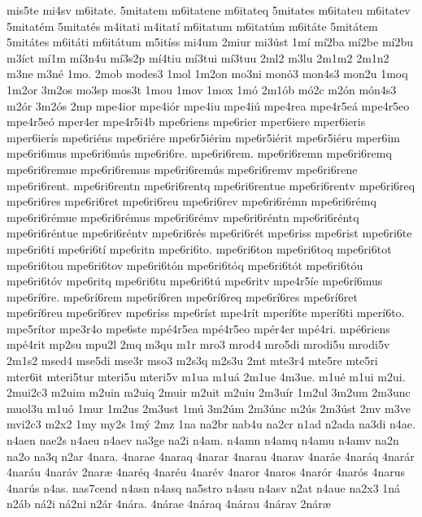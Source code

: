 {mis5te
mi4sv
m6itate.
5mitatem
m6itatene
m6itateq
5mitates
m6itateu
m6itatev
5mitat^^e9m
5mitat^^e9s
m4itati
m4itat^^ed
m6itatum
m6itat^^fam
m6it^^e1te
5mit^^e1tem
5mit^^e1tes
m6it^^e1ti
m6it^^e1tum
m5it^^edss
mi4um
2miur
mi3^^fast
1m^^ed
m^^ed2ba
m^^ed2be
m^^ed2bu
m3^^edct
m^^ed1m
m^^ed3n4u
m^^ed3s2p
m^^ed4tiu
m^^ed3tui
m^^ed3tuu
2ml2
m3lu
2m1m2
2m1n2
m3ne
m3n^^e9
1mo.
2mob
modes3
1mol
1m2on
mo3ni
mon^^f33
mon4s3
mon2u
1moq
1m2or
3m2os
mo3sp
mos3t
1mou
1mov
1mox
1m^^f3
2m1^^f3b
m^^f32c
m2^^f3n
m^^f3n4s3
m2^^f3r
3m2^^f3s
2mp
mpe4ior
mpe4i^^f3r
mpe4iu
mpe4i^^fa
mpe4rea
mpe4r5e^^e1
mpe4r5eo
mpe4r5e^^f3
mper4er
mpe4r5i4b
mpe6riens
mpe6rier
mper6iere
mper6ieris
mper6ier^^eds
mpe6ri^^e9ns
mpe6ri^^e9re
mpe6r5i^^e9rim
mpe6r5i^^e9rit
mpe6r5i^^e9ru
mper6im
mpe6ri6mus
mpe6ri6m^^fas
mpe6ri6re.
mpe6ri6rem.
mpe6ri6remn
mpe6ri6remq
mpe6ri6remue
mpe6ri6remus
mpe6ri6rem^^fas
mpe6ri6remv
mpe6ri6rene
mpe6ri6rent.
mpe6ri6rentn
mpe6ri6rentq
mpe6ri6rentue
mpe6ri6rentv
mpe6ri6req
mpe6ri6res
mpe6ri6ret
mpe6ri6reu
mpe6ri6rev
mpe6ri6r^^e9mn
mpe6ri6r^^e9mq
mpe6ri6r^^e9mue
mpe6ri6r^^e9mus
mpe6ri6r^^e9mv
mpe6ri6r^^e9ntn
mpe6ri6r^^e9ntq
mpe6ri6r^^e9ntue
mpe6ri6r^^e9ntv
mpe6ri6r^^e9s
mpe6ri6r^^e9t
mpe6riss
mpe6rist
mpe6ri6te
mpe6ri6ti
mpe6ri6t^^ed
mpe6ritn
mpe6ri6to.
mpe6ri6ton
mpe6ri6toq
mpe6ri6tot
mpe6ri6tou
mpe6ri6tov
mpe6ri6t^^f3n
mpe6ri6t^^f3q
mpe6ri6t^^f3t
mpe6ri6t^^f3u
mpe6ri6t^^f3v
mpe6ritq
mpe6ri6tu
mpe6ri6t^^fa
mpe6ritv
mpe4r5^^ede
mpe6r^^ed6mus
mpe6r^^ed6re.
mpe6r^^ed6rem
mpe6r^^ed6ren
mpe6r^^ed6req
mpe6r^^ed6res
mpe6r^^ed6ret
mpe6r^^ed6reu
mpe6r^^ed6rev
mpe6r^^edss
mpe6r^^edst
mpe4r^^edt
mper^^ed6te
mper^^ed6ti
mper^^ed6to.
mpe5r^^edtor
mpe3r4o
mpe6ste
mp^^e94r5ea
mp^^e94r5eo
mp^^e9r4er
mp^^e94ri.
mp^^e96riens
mp^^e94rit
mp2su
mpu2l
2mq
m3qu
m1r
mro3
mrod4
mro5di
mrodi5u
mrodi5v
2m1s2
msed4
mse5di
mse3r
mso3
m2s3q
m2s3u
2mt
mte3r4
mte5re
mte5ri
mter6it
mteri5tur
mteri5u
mteri5v
m1ua
m1u^^e1
2m1ue
4m3ue.
m1u^^e9
m1ui
m2ui.
2mui2c3
m2uim
m2uin
m2uiq
2muir
m2uit
m2uiu
2m3u^^edr
1m2ul
3m2um
2m3unc
muol3u
m1u^^f3
1mur
1m2us
2m3ust
1m^^fa
3m2^^fam
2m3^^fanc
m2^^fas
2m3^^fast
2mv
m3ve
mvi2c3
m2x2
1my
my2s
1m^^fd
2mz
1na
na2br
nab4u
na2cr
n1ad
n2ada
na3di
n4ae.
n4aen
nae2s
n4aeu
n4aev
na3ge
na2i
n4am.
n4amn
n4amq
n4amu
n4amv
na2n
na2o
na3q
n2ar
4nara.
4narae
4naraq
4narar
4narau
4narav
4nar^^e1e
4nar^^e1q
4nar^^e1r
4nar^^e1u
4nar^^e1v
2nar^^e6
4nar^^e9q
4nar^^e9u
4nar^^e9v
4naror
4naros
4nar^^f3r
4nar^^f3s
4narus
4nar^^fas
n4as.
nas7cend
n4asn
n4asq
na5stro
n4asu
n4asv
n2at
n4aue
na2x3
1n^^e1
n2^^e1b
n^^e12i
n^^e12ni
n2^^e1r
4n^^e1ra.
4n^^e1rae
4n^^e1raq
4n^^e1rau
4n^^e1rav
2n^^e1r^^e6
}
